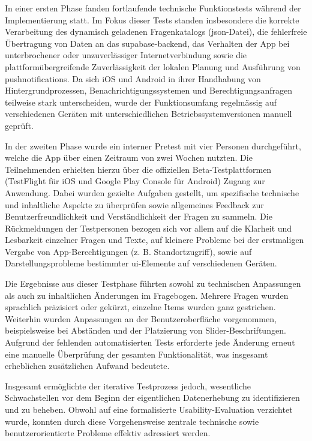 In einer ersten Phase fanden fortlaufende technische Funktionstests während der Implementierung statt. Im Fokus dieser Tests standen insbesondere die korrekte Verarbeitung des dynamisch geladenen Fragenkatalogs (\gls{json}-Datei), die fehlerfreie Übertragung von Daten an das \gls{supabase}-\gls{backend}, das Verhalten der App bei unterbrochener oder unzuverlässiger Internetverbindung sowie die plattformübergreifende Zuverlässigkeit der lokalen Planung und Ausführung von \glspl{pushnotification}. Da sich iOS und Android in ihrer Handhabung von Hintergrundprozessen, Benachrichtigungssystemen und Berechtigungsanfragen teilweise stark unterscheiden, wurde der Funktionsumfang regelmässig auf verschiedenen Geräten mit unterschiedlichen Betriebssystemversionen manuell geprüft.

In der zweiten Phase wurde ein interner Pretest mit vier Personen durchgeführt, welche die App über einen Zeitraum von zwei Wochen nutzten. Die Teilnehmenden erhielten hierzu über die offiziellen Beta-Testplattformen (TestFlight für iOS und Google Play Console für Android) Zugang zur Anwendung. Dabei wurden gezielte Aufgaben gestellt, um spezifische technische und inhaltliche Aspekte zu überprüfen sowie allgemeines Feedback zur Benutzerfreundlichkeit und Verständlichkeit der Fragen zu sammeln. Die Rückmeldungen der Testpersonen bezogen sich vor allem auf die Klarheit und Lesbarkeit einzelner Fragen und Texte, auf kleinere Probleme bei der erstmaligen Vergabe von App-Berechtigungen (z. B. Standortzugriff), sowie auf Darstellungsprobleme bestimmter \gls{ui}-Elemente auf verschiedenen Geräten.

Die Ergebnisse aus dieser Testphase führten sowohl zu technischen Anpassungen als auch zu inhaltlichen Änderungen im Fragebogen. Mehrere Fragen wurden sprachlich präzisiert oder gekürzt, einzelne Items wurden ganz gestrichen. Weiterhin wurden Anpassungen an der Benutzeroberfläche vorgenommen, beispielsweise bei Abständen und der Platzierung von Slider-Beschriftungen. Aufgrund der fehlenden automatisierten Tests erforderte jede Änderung erneut eine manuelle Überprüfung der gesamten Funktionalität, was insgesamt erheblichen zusätzlichen Aufwand bedeutete.

Insgesamt ermöglichte der iterative Testprozess jedoch, wesentliche Schwachstellen vor dem Beginn der eigentlichen Datenerhebung zu identifizieren und zu beheben. Obwohl auf eine formalisierte Usability-Evaluation verzichtet wurde, konnten durch diese Vorgehensweise zentrale technische sowie benutzerorientierte Probleme effektiv adressiert werden.

